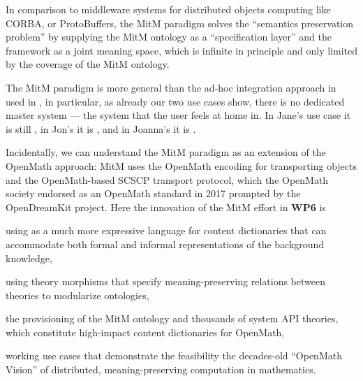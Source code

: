 In comparison to middleware systems for distributed objects computing like CORBA, or ProtoBuffers, the MitM paradigm solves the ``semantics preservation problem'' by supplying the MitM ontology as a ``specification layer'' and the \ommt framework as a joint meaning space, which is infinite in principle and only limited by the coverage of the MitM ontology. 

The MitM paradigm is more general than the ad-hoc integration approach in used in \Sage, in particular, as already our two use cases show, there is no dedicated master system --- the system that the user feels at home in.
In Jane's use case it is still \Sage, in Jon's it is \GAP, and in Joanna's it is \LMFDB.

Incidentally, we can understand the MitM paradigm as an extension of the OpenMath approach: MitM uses the OpenMath encoding for transporting objects and the OpenMath-based SCSCP transport protocol, which the OpenMath society endorsed as an OpenMath standard in 2017 prompted by the OpenDreamKit project.
Here the innovation of the MitM effort in \textbf{WP6} is
\begin{compactenum}
  \item using \ommt as a much more expressive language for content dictionaries that can accommodate both formal and informal representations of the background knowledge,
  \item using theory morphisms that specify meaning-preserving relations between theories to modularize ontologies,
  \item the provisioning of the MitM ontology and thousands of system API theories, which constitute high-impact content dictionaries for OpenMath,
  \item working use cases that demonstrate the feasibility the decades-old ``OpenMath Vision'' of distributed, meaning-preserving computation in mathematics.
\end{compactenum}

